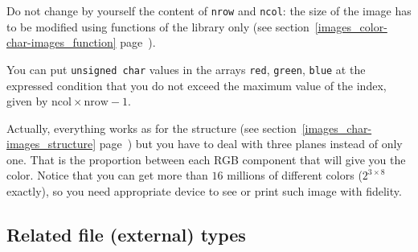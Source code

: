 Do not change by yourself the content of \verb+nrow+ and \verb+ncol+: the size
of the image has to be modified using functions of the library only (see section~\ref{images_color-char-images_function} page~\pageref{images_color-char-images_function}).

You can put \verb+unsigned char+ values in the arrays \verb+red+, \verb+green+,
\verb+blue+  at the expressed condition that you do not exceed the maximum value of the index,
given by $\mbox{ncol} \times \mbox{nrow} - 1$.

Actually, everything works as for the \cimage structure (see section~\ref{images_char-images_structure} page~\pageref{images_char-images_structure}) but you
have to deal with three planes instead of only one.
That is the proportion between each RGB component that will give you the
color. Notice that you can get more than $16$ millions of different colors
($2^{3 \times 8}$ exactly), so you need appropriate device to see or print
such image with fidelity.

\subsection{Related file (external) types}
\label{images_color-file_type}

